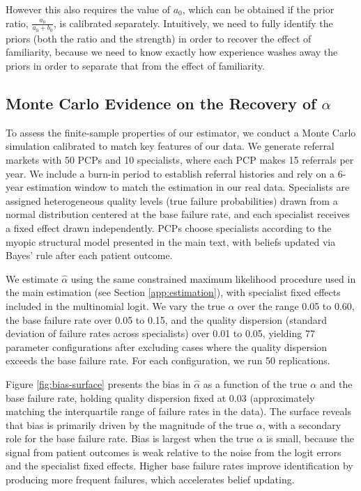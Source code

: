 \documentclass[12pt]{article}
\begin{document}
\begin{enumerate}
However this also requires the value of $a_0$, which can be obtained if the prior ratio, $\frac{a_0}{a_0 + b_0}$, is calibrated separately.
Intuitively, we need to fully identify the priors (both the ratio and the strength) in order to recover the effect of familiarity, because we need to know exactly how experience washes away the priors in order to separate that from the effect of familiarity.
\end{enumerate}


\subsection{Monte Carlo Evidence on the Recovery of $\alpha$}
\label{app:monte-carlo}


To assess the finite-sample properties of our estimator, we conduct a Monte Carlo simulation calibrated to match key features of our data. We generate referral markets with 50 PCPs and 10 specialists, where each PCP makes 15 referrals per year. We include a burn-in period to establish referral histories and rely on a 6-year estimation window to match the estimation in our real data. Specialists are assigned heterogeneous quality levels (true failure probabilities) drawn from a normal distribution centered at the base failure rate, and each specialist receives a fixed effect drawn independently. PCPs choose specialists according to the myopic structural model presented in the main text, with beliefs updated via Bayes' rule after each patient outcome.

We estimate $\hat\alpha$ using the same constrained maximum likelihood procedure used in the main estimation (see Section \ref{app:estimation}), with specialist fixed effects included in the multinomial logit. We vary the true $\alpha$ over the range 0.05 to 0.60, the base failure rate over 0.05 to 0.15, and the quality dispersion (standard deviation of failure rates across specialists) over 0.01 to 0.05, yielding 77 parameter configurations after excluding cases where the quality dispersion exceeds the base failure rate. For each configuration, we run 50 replications.

Figure \ref{fig:bias-surface} presents the bias in $\hat\alpha$ as a function of the true $\alpha$ and the base failure rate, holding quality dispersion fixed at 0.03 (approximately matching the interquartile range of failure rates in the data). The surface reveals that bias is primarily driven by the magnitude of the true $\alpha$, with a secondary role for the base failure rate. Bias is largest when the true $\alpha$ is small, because the signal from patient outcomes is weak relative to the noise from the logit errors and the specialist fixed effects. Higher base failure rates improve identification by producing more frequent failures, which accelerates belief updating.
\end{document}
